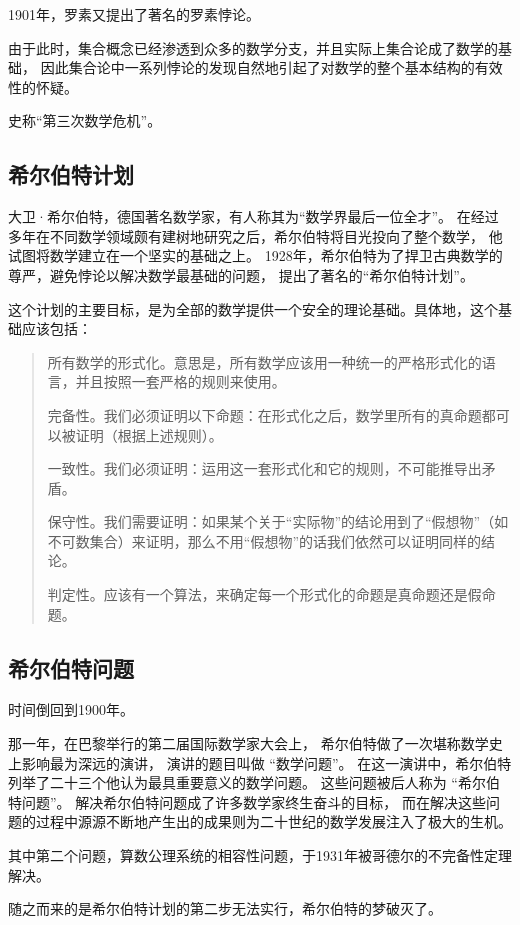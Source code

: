 \documentclass[12pt,a4paper,oneside]{ctexrep}
\theoremstyle{definition}
\begin{document}
1901年，罗素又提出了著名的罗素悖论。

由于此时，集合概念已经渗透到众多的数学分支，并且实际上集合论成了数学的基础，
因此集合论中一系列悖论的发现自然地引起了对数学的整个基本结构的有效性的怀疑。

史称“第三次数学危机”。

\subsection{希尔伯特计划}

大卫·希尔伯特，德国著名数学家，有人称其为“数学界最后一位全才”。
在经过多年在不同数学领域颇有建树地研究之后，希尔伯特将目光投向了整个数学，
他试图将数学建立在一个坚实的基础之上。
1928年，希尔伯特为了捍卫古典数学的尊严，避免悖论以解决数学最基础的问题，
提出了著名的“希尔伯特计划”。

这个计划的主要目标，是为全部的数学提供一个安全的理论基础。具体地，这个基础应该包括：
\begin{quote}
所有数学的形式化。意思是，所有数学应该用一种统一的严格形式化的语言，并且按照一套严格的规则来使用。

完备性。我们必须证明以下命题：在形式化之后，数学里所有的真命题都可以被证明（根据上述规则）。

一致性。我们必须证明：运用这一套形式化和它的规则，不可能推导出矛盾。

保守性。我们需要证明：如果某个关于“实际物”的结论用到了“假想物”（如不可数集合）来证明，那么不用“假想物”的话我们依然可以证明同样的结论。

判定性。应该有一个算法，来确定每一个形式化的命题是真命题还是假命题。
\end{quote}

\subsection{希尔伯特问题}

时间倒回到1900年。

那一年，在巴黎举行的第二届国际数学家大会上，
希尔伯特做了一次堪称数学史上影响最为深远的演讲，
演讲的题目叫做 “数学问题”。
在这一演讲中，希尔伯特列举了二十三个他认为最具重要意义的数学问题。
这些问题被后人称为 “希尔伯特问题”。
解决希尔伯特问题成了许多数学家终生奋斗的目标，
而在解决这些问题的过程中源源不断地产生出的成果则为二十世纪的数学发展注入了极大的生机\cite{tenth}。

其中第二个问题，算数公理系统的相容性问题，于1931年被哥德尔的不完备性定理解决。

随之而来的是希尔伯特计划的第二步无法实行，希尔伯特的梦破灭了。
\end{document}
